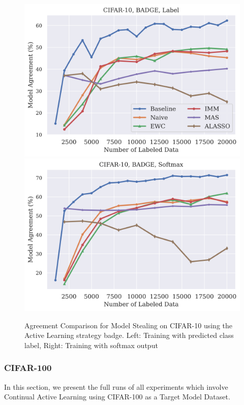 \begin{figure}[!htb]
    \centering
    \includegraphics[width=0.48\linewidth]{images/results_CALMS/cifar_label_badge.png} \hfill
    \includegraphics[width=0.48\linewidth]{images/results_CALMS/cifar_softmax_badge.png}
    \caption{Agreement Comparison for Model Stealing on CIFAR-10 using the Active Learning strategy \gls{badge}. Left: Training with predicted class label,
    Right: Training with softmax output}
    \label{fig:CALMSCIFAR10Badge}
\end{figure}

\clearpage

\subsubsection{CIFAR-100}
\label{sec:Appendix:CALMS:CIFAR100}
In this section, we present the full runs of all experiments which involve Continual Active Learning using CIFAR-100 as a Target Model Dataset.

